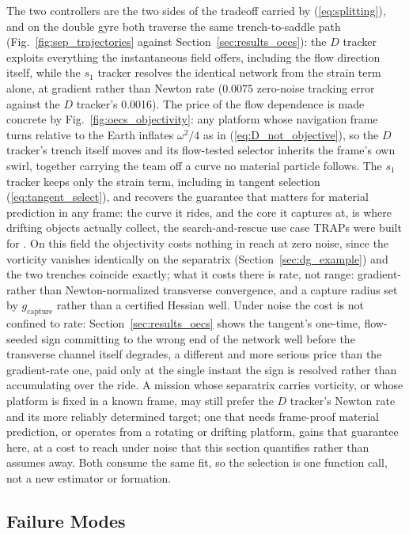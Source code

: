 \documentclass[lettersize,journal]{IEEEtran}
\begin{document}
The two controllers are the two sides of the tradeoff carried by
(\ref{eq:splitting}), and on the double gyre both traverse the same
trench-to-saddle path (Fig.~\ref{fig:sep_trajectories} against
Section~\ref{sec:results_oecs}): the $D$ tracker exploits everything the
instantaneous field offers, including the flow direction itself, while
the $s_1$ tracker resolves the identical network from the strain term
alone, at gradient rather than Newton rate (0.0075 zero-noise tracking
error against the $D$ tracker's 0.0016). The price of the flow dependence
is made concrete by Fig.~\ref{fig:oecs_objectivity}: any platform whose
navigation frame turns relative to the Earth inflates $\omega^2/4$ as in
(\ref{eq:D_not_objective}), so the $D$ tracker's trench itself moves and
its flow-tested selector inherits the frame's own swirl, together
carrying the team off a curve no material particle follows. The
$s_1$ tracker keeps only the strain term, including in tangent selection
(\ref{eq:tangent_select}), and recovers the guarantee that matters for
material prediction in any frame: the curve it rides, and the core it
captures at, is where drifting objects actually collect, the
search-and-rescue use case TRAPs were built for \cite{36}. On this field
the objectivity costs nothing in reach at zero noise, since the
vorticity vanishes identically on the separatrix
(Section~\ref{sec:dg_example}) and the two trenches coincide exactly;
what it costs there is rate, not range: gradient- rather than
Newton-normalized transverse convergence, and a capture radius set by
$g_{\text{capture}}$ rather than a certified Hessian well. Under noise
the cost is not confined to rate: Section~\ref{sec:results_oecs} shows
the tangent's one-time, flow-seeded sign committing to the wrong end of
the network well before the transverse channel itself degrades, a
different and more serious price than the gradient-rate one, paid only
at the single instant the sign is resolved rather than accumulating
over the ride. A mission whose separatrix carries vorticity, or whose
platform is fixed in a known frame, may still prefer the $D$ tracker's
Newton rate and its more reliably determined target; one that needs
frame-proof material prediction, or operates from a rotating or
drifting platform, gains that guarantee here, at a cost to reach under
noise that this section quantifies rather than assumes away. Both
consume the same fit, so the selection is one function call, not a new
estimator or formation.

\subsection{Failure Modes}
\end{document}
